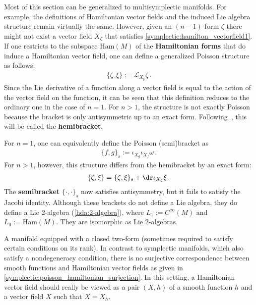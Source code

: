     \begin{remark}\label{symplectic:hamiltonian_forms}
        Most of this section can be generalized to multisymplectic manifolds. For example, the definitions of Hamiltonian vector fields and the induced Lie algebra structure remain virtually the same. However, given an $(n-1)$-form $\zeta$ there might not exist a vector field $X_\zeta$ that satisfies \cref{symplectic:hamilton_vectorfield1}. If one restricts to the subspace $\mathrm{Ham}(M)$ of the \textbf{Hamiltonian forms} that do induce a Hamiltonian vector field, one can define a generalized Poisson structure as follows:
        \begin{gather}
            \{\zeta,\xi\} := \mathcal{L}_{X_\xi}\zeta\,.
        \end{gather}
        Since the Lie derivative of a function along a vector field is equal to the action of the vector field on the function, it can be seen that this definition reduces to the ordinary one in the case of $n=1$. For $n>1$, the structure is not exactly Poisson because the bracket is only antisymmetric up to an exact form. Following~\citet{baez_categorified_2010}, this will be called the \textbf{hemibracket}.

        For $n=1$, one can equivalently define the Poisson (semi)bracket as
        \begin{gather}
            \{f,g\}_s := \iota_{X_g}\iota_{X_f}\omega\,.
        \end{gather}
        For $n>1$, however, this structure differs from the hemibracket by an exact form:
        \begin{gather}
            \{\zeta,\xi\} = \{\zeta,\xi\}_s + \dr\iota_{X_\zeta}\xi\,.
        \end{gather}
        The \textbf{semibracket} $\{\cdot,\cdot\}_s$ now satisfies antisymmetry, but it fails to satisfy the Jacobi identity. Although these brackets do not define a Lie algebra, they do define a Lie 2-algebra (\cref{hda:2-algebra}), where $L_1:=C^\infty(M)$ and $L_0:=\mathrm{Ham}(M)$. They are isomorphic as Lie 2-algebras.
    \end{remark}

    \begin{remark}
        A manifold equipped with a closed two-form (sometimes required to satisfy certain conditions on its rank). In contrast to symplectic manifolds, which also satisfy a nondegeneracy condition, there is no surjective correspondence between smooth functions and Hamiltonian vector fields as given in \cref{symplectic:poisson_hamiltonian_surjection}. In this setting, a Hamiltonian vector field should really be viewed as a pair $(X,h)$ of a smooth function $h$ and a vector field $X$ such that $X=X_h$.
    \end{remark}

